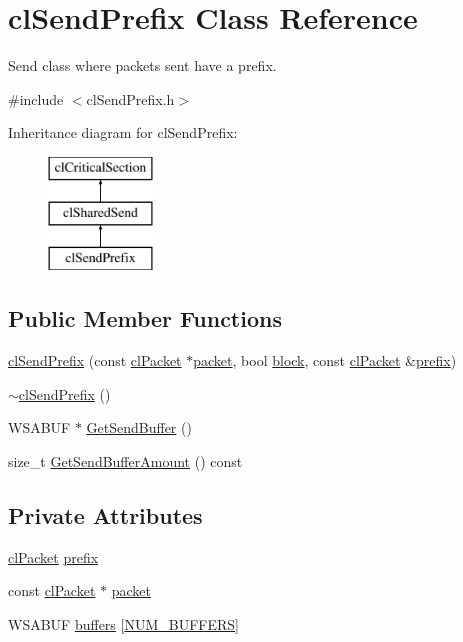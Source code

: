 \hypertarget{classcl_send_prefix}{
\section{clSendPrefix Class Reference}
\label{classcl_send_prefix}
}


Send class where packets sent have a prefix.  




{\ttfamily \#include $<$clSendPrefix.h$>$}

Inheritance diagram for clSendPrefix:\begin{figure}[H]
\begin{center}
\leavevmode
\includegraphics[height=3.000000cm]{classcl_send_prefix}
\end{center}
\end{figure}
\subsection*{Public Member Functions}
\begin{DoxyCompactItemize}
\item 
\hyperlink{classcl_send_prefix_a3b781cd71fefd4015f209f766a1ca5a0}{clSendPrefix} (const \hyperlink{classcl_packet}{clPacket} $\ast$\hyperlink{classcl_send_prefix_ab888e85e50e8e1418ab8d74928c963da}{packet}, bool \hyperlink{classcl_shared_send_aaaf411d2405cc3447a3bc11fe2ab2678}{block}, const \hyperlink{classcl_packet}{clPacket} \&\hyperlink{classcl_send_prefix_af5e8144995301e9887ffcd23348d8c7e}{prefix})
\item 
\hyperlink{classcl_send_prefix_ac3f41ae82ff48144fcef35b53d3b5e3c}{$\sim$clSendPrefix} ()
\item 
WSABUF $\ast$ \hyperlink{classcl_send_prefix_ad9fe2326102e9c43e87e577698580267}{GetSendBuffer} ()
\item 
size\_\-t \hyperlink{classcl_send_prefix_ab70ca2f9224334f80a84fb96b22c0cfe}{GetSendBufferAmount} () const 
\end{DoxyCompactItemize}
\subsection*{Private Attributes}
\begin{DoxyCompactItemize}
\item 
\hyperlink{classcl_packet}{clPacket} \hyperlink{classcl_send_prefix_af5e8144995301e9887ffcd23348d8c7e}{prefix}
\item 
const \hyperlink{classcl_packet}{clPacket} $\ast$ \hyperlink{classcl_send_prefix_ab888e85e50e8e1418ab8d74928c963da}{packet}
\item 
WSABUF \hyperlink{classcl_send_prefix_ae96577f7b0648d25bd11b447c7678210}{buffers} \mbox{[}\hyperlink{classcl_send_prefix_a37563065ef429279830e8d7f59fdcfbe}{NUM\_\-BUFFERS}\mbox{]}
\end{DoxyCompactItemize}
